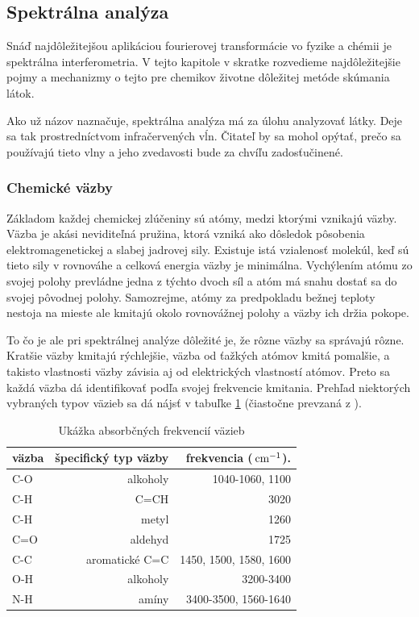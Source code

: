 \subsection{Spektrálna analýza}

Snáď najdôležitejšou aplikáciou fourierovej transformácie vo fyzike a
chémii je spektrálna interferometria. V tejto kapitole v skratke
rozvedieme najdôležitejšie pojmy a mechanizmy o tejto pre chemikov
životne dôležitej metóde skúmania látok.

Ako už názov naznačuje, spektrálna analýza má za úlohu analyzovať
látky. Deje sa tak prostredníctvom infračervených vĺn. Čitateľ by sa
mohol opýtať, prečo sa používajú tieto vlny a jeho zvedavosti bude za
chvíľu zadosťučinené.

\subsubsection{Chemické väzby}
Základom každej chemickej zlúčeniny sú atómy, medzi ktorými vznikajú
väzby. Väzba je akási neviditeľná pružina, ktorá vzniká ako dôsledok
pôsobenia elektromagenetickej a slabej jadrovej sily. Existuje istá
vzialenosť molekúl, keď sú tieto sily v rovnováhe a celková energia
väzby je minimálna. Vychýlením atómu zo svojej polohy prevládne jedna
z týchto dvoch síl a atóm má snahu dostať sa do svojej pôvodnej
polohy. Samozrejme, atómy za predpokladu bežnej teploty nestoja na
mieste ale kmitajú okolo rovnovážnej polohy a väzby ich držia pokope.

To čo je ale pri spektrálnej analýze dôležité je, že rôzne väzby sa
správajú rôzne. Kratšie väzby kmitajú rýchlejšie, väzba od ťažkých
atómov kmitá pomalšie, a takisto vlastnosti väzby závisia aj od
elektrických vlastností atómov. Preto sa každá väzba dá identifikovať
podľa svojej frekvencie kmitania. Prehľad niektorých vybraných typov
väzieb sa dá nájsť v tabuľke \ref{tab:vazby} (čiastočne prevzaná z \cite{wiki:spectro}).

\begin{table}[htb]
\centering
\begin{tabular}{| l | r | r |}
\hline
väzba & špecifický typ väzby & frekvencia ($\,\mbox{cm}^{-1}$). \\ \hline
C-O & alkoholy & 1040-1060, 1100 \\ \hline
C-H & C=CH & 3020 \\ \hline
C-H & metyl & 1260 \\ \hline
C=O & aldehyd & 1725 \\ \hline
C-C & aromatické C=C & 1450, 1500, 1580, 1600 \\ \hline
O-H & alkoholy & 3200-3400 \\ \hline
N-H & amíny & 3400-3500, 1560-1640 \\ \hline
\end{tabular}
\caption{Ukážka absorbčných frekvencií väzieb}\label{tab:vazby}
\end{table}


